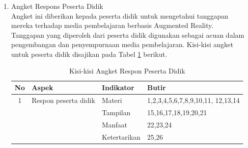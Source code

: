 \documentclass[12pt]{article}
\begin{document}
\begin{enumerate}
\begin{enumerate}
\begin{enumerate}
\begin{table}[H]
\begin{tabular}{|c|p{4cm}|p{7cm}|p{3cm}|}
                \end{tabular}
            \end{table}
            \item Angket Respons Peserta Didik\\
            \hspace*{1cm}Angket ini diberikan kepada peserta didik untuk mengetahui tanggapan mereka terhadap media pembelajaran berbasis Augmented Reality. Tanggapan yang diperoleh dari peserta didik digunakan sebagai acuan dalam pengembangan dan penyempurnaan media pembelajaran. Kisi-kisi angket untuk peserta didik disajikan pada Tabel \ref{kisiresponsiswa} berikut.
            \begin{table}[H]
                \centering
                \caption{Kisi-kisi Angket Respon Peserta Didik}
                \label{kisiresponsiswa}
                \begin{tabular}{|c|p{4cm}|p{3cm}|p{4cm}|}
                    \hline
                    \textbf{No} & \textbf{Aspek} & \textbf{Indikator} & \textbf{Butir}\\
                    \hline
                    1 & Respon peserta didik & Materi & 1,2,3,4,5,6,7,8,9,10,11, 12,13,14\\
                    && Tampilan & 15,16,17,18,19,20,21\\
                    && Manfaat & 22,23,24\\
                    && Ketertarikan & 25,26\\
                    \hline


\end{tabular}
\end{table}
\end{enumerate}
\end{enumerate}
\end{enumerate}
\end{document}
